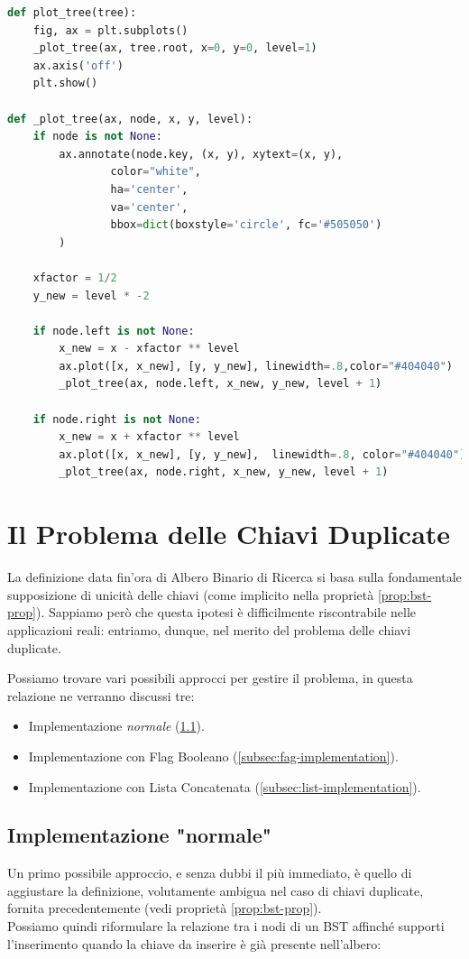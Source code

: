 \documentclass{article}
\begin{document}
\begin{lstlisting}[language=Python, caption={Rappresentazione Grfaica di un BST}, label=tree-plot]
def plot_tree(tree):
    fig, ax = plt.subplots()
    _plot_tree(ax, tree.root, x=0, y=0, level=1)
    ax.axis('off')
    plt.show()

def _plot_tree(ax, node, x, y, level):
    if node is not None:
        ax.annotate(node.key, (x, y), xytext=(x, y),
                color="white",    
                ha='center',
                va='center', 
                bbox=dict(boxstyle='circle', fc='#505050')
        )

    xfactor = 1/2
    y_new = level * -2

    if node.left is not None:
        x_new = x - xfactor ** level
        ax.plot([x, x_new], [y, y_new], linewidth=.8,color="#404040")
        _plot_tree(ax, node.left, x_new, y_new, level + 1)

    if node.right is not None:
        x_new = x + xfactor ** level
        ax.plot([x, x_new], [y, y_new],  linewidth=.8, color="#404040")
        _plot_tree(ax, node.right, x_new, y_new, level + 1)
\end{lstlisting}


\section{Il Problema delle Chiavi Duplicate}
La definizione data fin'ora di Albero Binario di Ricerca si basa sulla fondamentale supposizione di unicità delle chiavi
(come implicito nella proprietà \ref{prop:bst-prop}).
Sappiamo però che questa ipotesi è difficilmente riscontrabile nelle applicazioni reali:
entriamo, dunque, nel merito del problema delle chiavi duplicate.

Possiamo trovare vari possibili approcci per gestire il problema, in questa relazione ne verranno discussi tre:  



\begin{itemize}
	\item Implementazione \textit{normale} (\ref{subsec:normal-implementation}).
	\item Implementazione con Flag Booleano (\ref{subsec:fag-implementation}).
	\item Implementazione con Lista Concatenata (\ref{subsec:list-implementation}).
\end{itemize}


 
\subsection{Implementazione "normale"}\label{subsec:normal-implementation}
Un primo possibile approccio, e senza dubbi il più immediato, è quello di aggiustare la definizione, volutamente ambigua nel caso di chiavi duplicate, fornita precedentemente (vedi proprietà \ref{prop:bst-prop}).\\
Possiamo quindi riformulare la relazione tra i nodi di un BST affinché supporti l'inserimento quando la chiave da inserire è già presente nell'albero:
\end{document}
